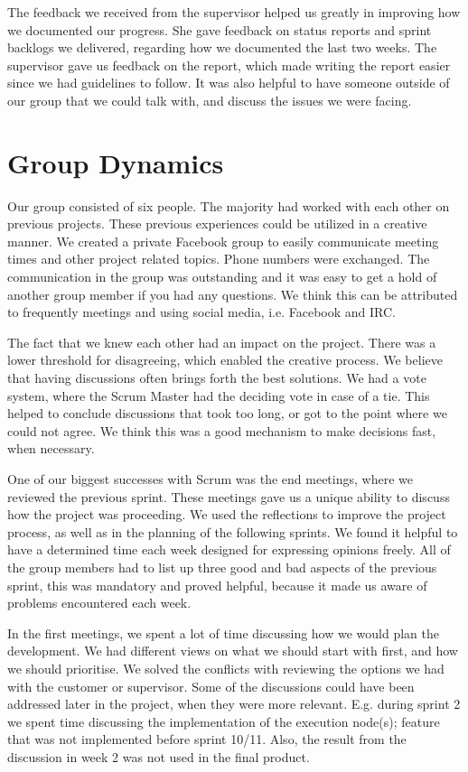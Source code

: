 The feedback we received from the supervisor helped us greatly in
improving how we documented our progress. She gave feedback on status
reports and sprint backlogs we delivered, regarding how we documented
the last two weeks. The supervisor gave us feedback on the report,
which made writing the report easier since we had guidelines to follow.
It was also helpful to have someone outside of our group that we could
talk with, and discuss the issues we were facing.

\section{Group Dynamics}

Our group consisted of six people. The majority had worked with each
other on previous projects. These previous experiences could be
utilized in a creative manner. We created a private Facebook group to
easily communicate meeting times and other project related topics.
Phone numbers were exchanged. The communication in the group was
outstanding and it was easy to get a hold of another group member if
you had any questions. We think this can be attributed to frequently
meetings and using social media, i.e. Facebook and IRC.

The fact that we knew each other had an impact on the project. There was
a lower threshold for disagreeing, which enabled the creative process.
We believe that having discussions often brings forth the best
solutions. We had a vote system, where the Scrum Master had the
deciding vote in case of a tie. This helped to conclude discussions
that took too long, or got to the point where we could not agree. We
think this was a good mechanism to make decisions fast, when necessary.


One of our biggest successes with Scrum was the end meetings, where we
reviewed the previous sprint. These meetings gave us a unique ability
to discuss how the project was proceeding. We used the reflections to
improve the project process, as well as in the planning of the
following sprints. We found it helpful to have a determined time each
week designed for expressing opinions freely. All of the group members
had to list up three good and bad aspects of the previous sprint, this
was mandatory and proved helpful, because it made us aware of problems
encountered each week. 

In the first meetings, we spent a lot of time discussing how we would
plan the development. We had different views on what we should start
with first, and how we should prioritise. We solved the conflicts with
reviewing the options we had with the customer or supervisor. Some of
the discussions could have been addressed later in the project, when
they were more relevant. E.g. during sprint 2 we spent time discussing
the implementation of the execution node(s); feature that was not
implemented before sprint 10/11. Also, the result from the discussion
in week 2 was not used in the final product. \ 

